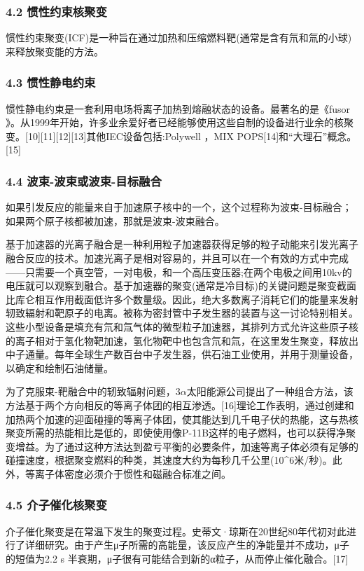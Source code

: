\subsubsection{4.2 惯性约束核聚变}
惯性约束聚变(ICF)是一种旨在通过加热和压缩燃料靶(通常是含有氘和氚的小球)来释放聚变能的方法。
\subsubsection{4.3 惯性静电约束}
惯性静电约束是一套利用电场将离子加热到熔融状态的设备。最著名的是《fusor 》。从1999年开始，许多业余爱好者已经能够使用这些自制的设备进行业余的核聚变。[10][11][12][13]其他IEC设备包括:Polywell ，MIX POPS[14]和“大理石”概念。[15]
\subsubsection{4.4 波束-波束或波束-目标融合}
如果引发反应的能量来自于加速原子核中的一个，这个过程称为波束-目标融合；如果两个原子核都被加速，那就是波束-波束融合。

基于加速器的光离子融合是一种利用粒子加速器获得足够的粒子动能来引发光离子融合反应的技术。加速光离子是相对容易的，并且可以在一个有效的方式中完成——只需要一个真空管，一对电极，和一个高压变压器;在两个电极之间用10kv的电压就可以观察到融合。基于加速器的聚变(通常是冷目标)的关键问题是聚变截面比库仑相互作用截面低许多个数量级。因此，绝大多数离子消耗它们的能量来发射轫致辐射和靶原子的电离。被称为密封管中子发生器的装置与这一讨论特别相关。这些小型设备是填充有氘和氚气体的微型粒子加速器，其排列方式允许这些原子核的离子相对于氢化物靶加速，氢化物靶中也包含氘和氚，在这里发生聚变，释放出中子通量。每年全球生产数百台中子发生器，供石油工业使用，并用于测量设备，以确定和绘制石油储量。

为了克服束-靶融合中的轫致辐射问题，$3 \alpha$太阳能源公司提出了一种组合方法，该方法基于两个方向相反的等离子体团的相互渗透。[16]理论工作表明，通过创建和加热两个加速的迎面碰撞的等离子体团，使其能达到几千电子伏的热能，这与热核聚变所需的热能相比是低的，即使使用像P-11B这样的电子燃料，也可以获得净聚变增益。为了通过这种方法达到盈亏平衡的必要条件，加速等离子体必须有足够的碰撞速度，根据聚变燃料的种类，其速度大约为每秒几千公里(10^6米/秒)。此外，等离子体密度必须介于惯性和磁融合标准之间。
\subsubsection{4.5 介子催化核聚变}
介子催化聚变是在常温下发生的聚变过程。史蒂文·琼斯在20世纪80年代初对此进行了详细研究。由于产生μ子所需的高能量，该反应产生的净能量并不成功，μ子的短值为2.2 s 半衰期，μ子很有可能结合到新的α粒子，从而停止催化融合。[17]
